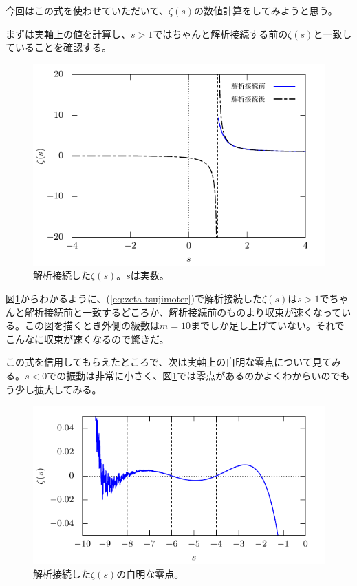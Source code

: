 \documentclass[11pt,b5paper,papersize,dvipdfmx]{jsbook}
\begin{document}
今回はこの式を使わせていただいて、$\zeta(s)$の数値計算をしてみようと思う。\par
まずは実軸上の値を計算し、$s>1$ではちゃんと解析接続する前の$\zeta(s)$と一致していることを確認する。
%
\begin{figure}[H]
  \centering
  \includegraphics{nkym/gnuplot/zeta02/real-main.pdf}
  \caption{解析接続した$\zeta(s)$。$s$は実数。}
  \label{fig:real-zeta}
\end{figure}
%
図\ref{fig:real-zeta}からわかるように、(\ref{eq:zeta-tsujimoter})で解析接続した$\zeta(s)$は$s>1$でちゃんと解析接続前と一致するどころか、解析接続前のものより収束が速くなっている。この図を描くとき外側の級数は$m=10$までしか足し上げていない。それでこんなに収束が速くなるので驚きだ。\par
この式を信用してもらえたところで、次は実軸上の自明な零点について見てみる。$s<0$での振動は非常に小さく、図\ref{fig:real-zeta}では零点があるのかよくわからいのでもう少し拡大してみる。
%
\begin{figure}[H]
  \centering
  \includegraphics{nkym/gnuplot/zeta02/jimei-main.pdf}
  \caption{解析接続した$\zeta(s)$の自明な零点。}
  \label{fig:jimei-zeta}
\end{figure}
\end{document}
